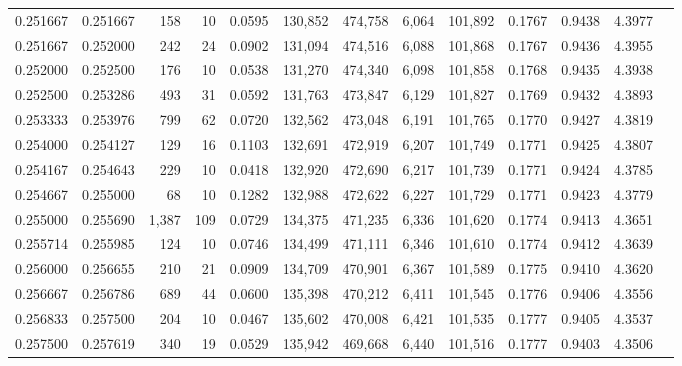 \begin{tabular}{rrrrrrrrrrrrr}
0.251667 & 0.251667 &   158 &  10 &                                     0.0595 & 130,852 & 474,758 &   6,064 & 101,892 & 0.1767 & 0.9438 & 4.3977 \\
0.251667 & 0.252000 &   242 &  24 &                                     0.0902 & 131,094 & 474,516 &   6,088 & 101,868 & 0.1767 & 0.9436 & 4.3955 \\
0.252000 & 0.252500 &   176 &  10 &                                     0.0538 & 131,270 & 474,340 &   6,098 & 101,858 & 0.1768 & 0.9435 & 4.3938 \\
0.252500 & 0.253286 &   493 &  31 &                                     0.0592 & 131,763 & 473,847 &   6,129 & 101,827 & 0.1769 & 0.9432 & 4.3893 \\
0.253333 & 0.253976 &   799 &  62 &                                     0.0720 & 132,562 & 473,048 &   6,191 & 101,765 & 0.1770 & 0.9427 & 4.3819 \\
0.254000 & 0.254127 &   129 &  16 &                                     0.1103 & 132,691 & 472,919 &   6,207 & 101,749 & 0.1771 & 0.9425 & 4.3807 \\
0.254167 & 0.254643 &   229 &  10 &                                     0.0418 & 132,920 & 472,690 &   6,217 & 101,739 & 0.1771 & 0.9424 & 4.3785 \\
0.254667 & 0.255000 &    68 &  10 &                                     0.1282 & 132,988 & 472,622 &   6,227 & 101,729 & 0.1771 & 0.9423 & 4.3779 \\
0.255000 & 0.255690 & 1,387 & 109 &                                     0.0729 & 134,375 & 471,235 &   6,336 & 101,620 & 0.1774 & 0.9413 & 4.3651 \\
0.255714 & 0.255985 &   124 &  10 &                                     0.0746 & 134,499 & 471,111 &   6,346 & 101,610 & 0.1774 & 0.9412 & 4.3639 \\
0.256000 & 0.256655 &   210 &  21 &                                     0.0909 & 134,709 & 470,901 &   6,367 & 101,589 & 0.1775 & 0.9410 & 4.3620 \\
0.256667 & 0.256786 &   689 &  44 &                                     0.0600 & 135,398 & 470,212 &   6,411 & 101,545 & 0.1776 & 0.9406 & 4.3556 \\
0.256833 & 0.257500 &   204 &  10 &                                     0.0467 & 135,602 & 470,008 &   6,421 & 101,535 & 0.1777 & 0.9405 & 4.3537 \\
0.257500 & 0.257619 &   340 &  19 &                                     0.0529 & 135,942 & 469,668 &   6,440 & 101,516 & 0.1777 & 0.9403 & 4.3506 \\

\end{tabular}
